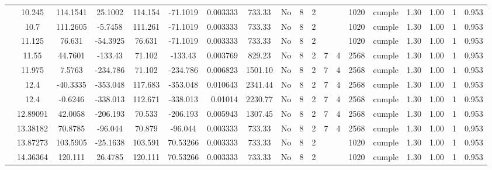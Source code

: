 \begin{table}[H]
{\begin{tabular}{|c|c|c|c|c|c|r|c|c|c|c|c|c|c|c|c|c|c|c|}
\cline{2-19}        & 10.245 & 114.1541 & 25.1002 & 114.154 & -71.1019 & 0.003333 & 733.33 & No  & 8   & 2   &     &     & 1020 & \cellcolor[rgb]{ .776,  .937,  .808}cumple & 1.30 & 1.00 & 1   & 0.953 \bigstrut\\
\cline{2-19}        & 10.7 & 111.2605 & -5.7458 & 111.261 & -71.1019 & 0.003333 & 733.33 & No  & 8   & 2   &     &     & 1020 & \cellcolor[rgb]{ .776,  .937,  .808}cumple & 1.30 & 1.00 & 1   & 0.953 \bigstrut\\
\cline{2-19}        & 11.125 & 76.631 & -54.3925 & 76.631 & -71.1019 & 0.003333 & 733.33 & No  & 8   & 2   &     &     & 1020 & \cellcolor[rgb]{ .776,  .937,  .808}cumple & 1.30 & 1.00 & 1   & 0.953 \bigstrut\\
\cline{2-19}        & 11.55 & 44.7601 & -133.43 & 71.102 & -133.43 & 0.003769 & 829.23 & No  & 8   & 2   & 7   & 4   & 2568 & \cellcolor[rgb]{ .776,  .937,  .808}cumple & 1.30 & 1.00 & 1   & 0.953 \bigstrut\\
\cline{2-19}        & 11.975 & 7.5763 & -234.786 & 71.102 & -234.786 & 0.006823 & 1501.10 & No  & 8   & 2   & 7   & 4   & 2568 & \cellcolor[rgb]{ .776,  .937,  .808}cumple & 1.30 & 1.00 & 1   & 0.953 \bigstrut\\
\cline{2-19}        & \cellcolor[rgb]{ .851,  .882,  .949}12.4 & -40.3335 & -353.048 & 117.683 & -353.048 & 0.010643 & 2341.44 & No  & 8   & 2   & 7   & 4   & 2568 & \cellcolor[rgb]{ .776,  .937,  .808}cumple & 1.30 & 1.00 & 1   & 0.953 \bigstrut\\
\cline{2-19}        & \cellcolor[rgb]{ .851,  .882,  .949}12.4 & -0.6246 & -338.013 & 112.671 & -338.013 & 0.01014 & 2230.77 & No  & 8   & 2   & 7   & 4   & 2568 & \cellcolor[rgb]{ .776,  .937,  .808}cumple & 1.30 & 1.00 & 1   & 0.953 \bigstrut\\
\cline{2-19}        & 12.89091 & 42.0058 & -206.193 & 70.533 & -206.193 & 0.005943 & 1307.45 & No  & 8   & 2   & 7   & 4   & 2568 & \cellcolor[rgb]{ .776,  .937,  .808}cumple & 1.30 & 1.00 & 1   & 0.953 \bigstrut\\
\cline{2-19}        & 13.38182 & 70.8785 & -96.044 & 70.879 & -96.044 & 0.003333 & 733.33 & No  & 8   & 2   & 7   & 4   & 2568 & \cellcolor[rgb]{ .776,  .937,  .808}cumple & 1.30 & 1.00 & 1   & 0.953 \bigstrut\\
\cline{2-19}        & 13.87273 & 103.5905 & -25.1638 & 103.591 & 70.53266 & 0.003333 & 733.33 & No  & 8   & 2   &     &     & 1020 & \cellcolor[rgb]{ .776,  .937,  .808}cumple & 1.30 & 1.00 & 1   & 0.953 \bigstrut\\
\cline{2-19}        & 14.36364 & 120.111 & 26.4785 & 120.111 & 70.53266 & 0.003333 & 733.33 & No  & 8   & 2   &     &     & 1020 & \cellcolor[rgb]{ .776,  .937,  .808}cumple & 1.30 & 1.00 & 1   & 0.953 \bigstrut\\

\end{tabular}}
\end{table}
